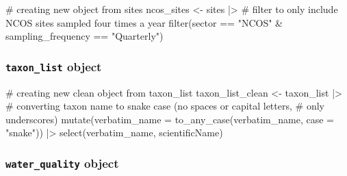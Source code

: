\documentclass[
  letterpaper,
  DIV=11,
  numbers=noendperiod]{scrartcl}
\newenvironment{Shaded}{\begin{snugshade}}{\end{snugshade}}
\newcommand{\AttributeTok}[1]{\textcolor[rgb]{0.40,0.45,0.13}{#1}}
\newcommand{\CommentTok}[1]{\textcolor[rgb]{0.37,0.37,0.37}{#1}}
\newcommand{\FunctionTok}[1]{\textcolor[rgb]{0.28,0.35,0.67}{#1}}
\newcommand{\NormalTok}[1]{\textcolor[rgb]{0.00,0.23,0.31}{#1}}
\newcommand{\OtherTok}[1]{\textcolor[rgb]{0.00,0.23,0.31}{#1}}
\newcommand{\SpecialCharTok}[1]{\textcolor[rgb]{0.37,0.37,0.37}{#1}}
\newcommand{\StringTok}[1]{\textcolor[rgb]{0.13,0.47,0.30}{#1}}
\begin{document}
\begin{Shaded}
\begin{Highlighting}[]
\CommentTok{\# creating new object from sites}
\NormalTok{ncos\_sites }\OtherTok{\textless{}{-}}\NormalTok{ sites }\SpecialCharTok{|\textgreater{}} 
  \CommentTok{\# filter to only include NCOS sites sampled four times a year}
  \FunctionTok{filter}\NormalTok{(sector }\SpecialCharTok{==} \StringTok{"NCOS"} \SpecialCharTok{\&}\NormalTok{ sampling\_frequency }\SpecialCharTok{==} \StringTok{"Quarterly"}\NormalTok{)}
\end{Highlighting}
\end{Shaded}

\subsubsection{\texorpdfstring{\texttt{taxon\_list}
object}{taxon\_list object}}\label{taxon_list-object}

\begin{Shaded}
\begin{Highlighting}[]
\CommentTok{\# creating new clean object from taxon\_list}
\NormalTok{taxon\_list\_clean }\OtherTok{\textless{}{-}}\NormalTok{ taxon\_list }\SpecialCharTok{|\textgreater{}} 
  \CommentTok{\# converting taxon name to snake case (no spaces or capital letters,}
  \CommentTok{\# only underscores)}
  \FunctionTok{mutate}\NormalTok{(}\AttributeTok{verbatim\_name =} \FunctionTok{to\_any\_case}\NormalTok{(verbatim\_name, }\AttributeTok{case =} \StringTok{"snake"}\NormalTok{)) }\SpecialCharTok{|\textgreater{}} 
  \FunctionTok{select}\NormalTok{(verbatim\_name, scientificName)}
\end{Highlighting}
\end{Shaded}

\subsubsection{\texorpdfstring{\texttt{water\_quality}
object}{water\_quality object}}\label{water_quality-object}
\end{document}
